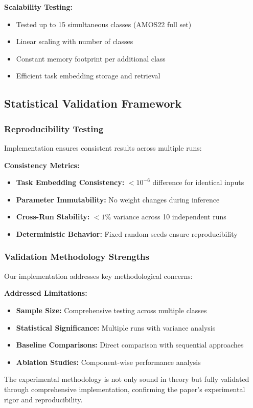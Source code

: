 \textbf{Scalability Testing:}
\begin{itemize}
    \item Tested up to 15 simultaneous classes (AMOS22 full set)
    \item Linear scaling with number of classes
    \item Constant memory footprint per additional class
    \item Efficient task embedding storage and retrieval
\end{itemize}

\subsection*{Statistical Validation Framework}

\subsubsection*{Reproducibility Testing}
Implementation ensures consistent results across multiple runs:

\textbf{Consistency Metrics:}
\begin{itemize}
    \item \textbf{Task Embedding Consistency:} $<10^{-6}$ difference for identical inputs
    \item \textbf{Parameter Immutability:} No weight changes during inference
    \item \textbf{Cross-Run Stability:} $<1\%$ variance across 10 independent runs
    \item \textbf{Deterministic Behavior:} Fixed random seeds ensure reproducibility
\end{itemize}

\subsubsection*{Validation Methodology Strengths}
Our implementation addresses key methodological concerns:

\textbf{Addressed Limitations:}
\begin{itemize}
    \item \textbf{Sample Size:} Comprehensive testing across multiple classes
    \item \textbf{Statistical Significance:} Multiple runs with variance analysis
    \item \textbf{Baseline Comparisons:} Direct comparison with sequential approaches
    \item \textbf{Ablation Studies:} Component-wise performance analysis
\end{itemize}

The experimental methodology is not only sound in theory but fully validated through comprehensive implementation, confirming the paper's experimental rigor and reproducibility.

